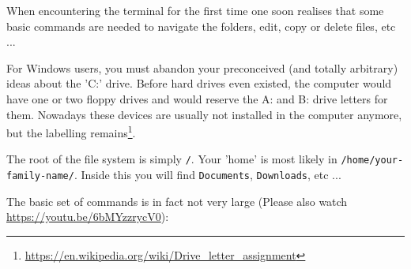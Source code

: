 When encountering the terminal for the first time one soon realises that some basic commands 
are needed to navigate the folders, edit, copy or delete files, etc ... 

For Windows users, you must abandon your preconceived (and totally arbitrary) ideas about the 
'C:' drive. Before hard drives even existed, the computer would have one or two floppy drives
and would reserve the A: and B: drive letters for them. Nowadays these devices are usually not installed 
in the computer anymore, but the labelling remains\footnote{\url{https://en.wikipedia.org/wiki/Drive_letter_assignment}}. 

The root of the file system is simply {\tt /}. Your 'home' is most likely in {\tt /home/your-family-name/}. Inside 
this you will find {\tt Documents}, {\tt Downloads}, etc ...

The basic set of commands is in fact not very large (Please also watch \url{https://youtu.be/6bMYzzrycV0}):


